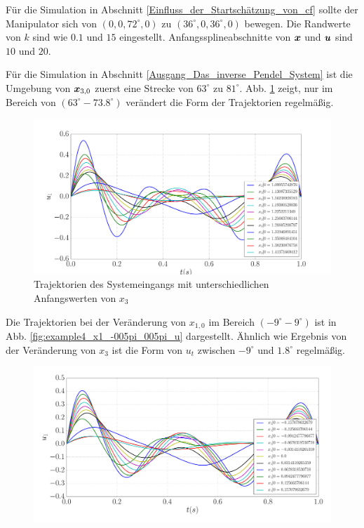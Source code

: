 \begin{appendices}
	Für die Simulation in Abschnitt \ref{Einfluss_der_Startschätzung_von_cf} sollte der Manipulator sich von $(0,0,72^{\circ},0)$ zu $(36^{\circ},0,36^{\circ},0)$ bewegen. Die Randwerte von $k$ sind wie $0.1$ und $15$ eingestellt. Anfangssplineabschnitte von $\boldsymbol x$ und $\boldsymbol u$ sind $10$ und $20$.
	
	Für die Simulation in Abschnitt \ref{Ausgang_Das_inverse_Pendel_System} ist die Umgebung von $\boldsymbol x_{3,0}$ zuerst eine Strecke von $63^{\circ}$ zu $81^{\circ}$. Abb. \ref{fig:example4_x3_035pi_045pi_u} zeigt, nur im Bereich von $(63^{\circ}-73.8^{\circ})$ verändert die Form der Trajektorien regelmäßig.
	\begin{figure}[!h]
		\centering
		\includegraphics[width=\linewidth]{bild/30_32/example4_x3_035pi_045pi_u.pdf}
		\caption{Trajektorien des Systemeingangs mit unterschiedlichen Anfangswerten von $x_{3}$}
		\label{fig:example4_x3_035pi_045pi_u}
	\end{figure}
	Die Trajektorien bei der Veränderung von $x_{1,0}$ im Bereich $(-9^{\circ}-9^{\circ})$ ist in Abb. \ref{fig:example4_x1_-005pi_005pi_u} dargestellt. Ähnlich wie Ergebnis von der Veränderung von $x_{3}$ ist die Form von $u_{t}$ zwischen $-9^{\circ}$ und $1.8^{\circ}$ regelmäßig. 
	\begin{figure}[!h]
		\centering
		\includegraphics[width=\linewidth]{bild/30_32/example4_x1_-005pi_005pi_u.pdf}

\end{figure}
\end{appendices}

